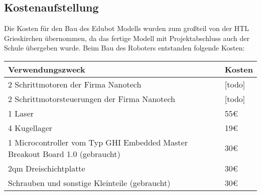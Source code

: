 \subsection{Kostenaufstellung}
Die Kosten für den Bau des Edubot Modells wurden zum großteil von der HTL Grieskirchen übernommen, da das fertige Modell mit Projektabschluss auch der Schule übergeben wurde. Beim Bau des Roboters entstanden folgende Kosten:

\begin{tabular}{|p{11cm}|p{3cm}|}
\hline \rowcolor{lightgray}
\textbf{Verwendungszweck} & \textbf{Kosten}\\
\hline
2 Schrittmotoren der Firma Nanotech & [todo]\\
\hline
2 Schrittmotorsteuerungen der Firma Nanotech & [todo]\\
\hline
1 Laser & 55\euro{}\\
\hline
4 Kugellager & 19\euro{}\\
\hline
1 Microcontroller vom Typ GHI Embedded Master Breakout Board 1.0 (gebraucht) & 30\euro{}\\ 
\hline
2qm Dreischichtplatte & 30\euro{}\\ 
\hline
Schrauben und sonstige Kleinteile (gebraucht) & 30\euro{}\\ 
\hline
\end{tabular}